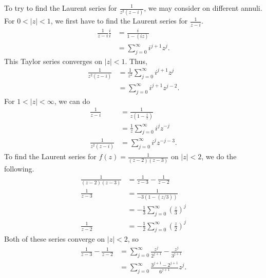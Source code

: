\documentclass[10pt]{extarticle}
\begin{document}
  To try to find the Laurent series for $\frac{1}{z^2(z-i)}$, we may consider on different annuli. For $0 < |z| < 1$, we first have to find the Laurent series for $\frac{1}{z-i}$.
  \begin{align*}
    \frac{1}{z-i}\frac{i}{i} &= \frac{i}{1 - (iz)}\\
                             &= \sum_{j=0}^{\infty} i^{j+1}z^j.
  \end{align*}
  This Taylor series converges on $|z|<1$. Thus,
  \begin{align*}
    \frac{1}{z^2 (z-i)} &= \frac{1}{z^2}\sum_{j=0}^{\infty}i^{j+1} z^j\\
                        &= \sum_{j=0}^{\infty}i^{j+1}z^{j-2}.
  \end{align*}
  For $1 < |z| < \infty$, we can do
  \begin{align*}
    \frac{1}{z-i} &= \frac{1}{z\left(1-\frac{i}{z}\right)}\\
                  &= \frac{1}{z}\sum_{j=0}^{\infty}i^jz^{-j}\\
    \frac{1}{z^2(z-i)} &= \sum_{j=0}^{\infty}i^jz^{-j-3}.
  \end{align*}
  To find the Laurent series for $f(z) = \frac{1}{(z-2)(z-3)}$ on $|z| < 2$, we do the following.
  \begin{align*}
    \frac{1}{(z-2)(z-3)} &= \frac{1}{z-3} - \frac{1}{z-2}\\
           \frac{1}{z-3} &= \frac{1}{-3\left(1-(z/3)\right)}\\
                         &= -\frac{1}{3}\sum_{j=0}^{\infty}\left(\frac{z}{3}\right)^{j}\\
           \frac{1}{z-2} &= -\frac{1}{2}\sum_{j=0}^{\infty}\left(\frac{z}{2}\right)^j
  \end{align*}
  Both of these series converge on $|z|<2$, so
  \begin{align*}
    \frac{1}{z-3} - \frac{1}{z-2} &= \sum_{j=0}^{\infty}\frac{z^j}{2^{j+1}} - \frac{z^j}{3^{j+1}}\\
                                  &= \sum_{j=0}^{\infty} \frac{3^{j+1}-2^{j+1}}{6^{j+1}}z^j.
  \end{align*}
\end{document}
